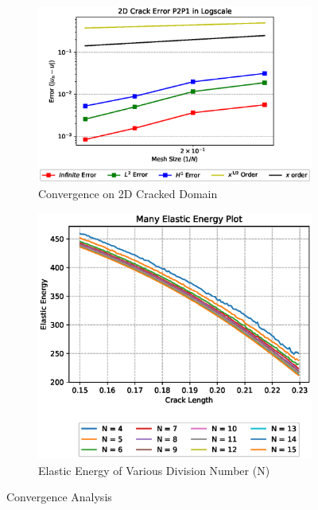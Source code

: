 \documentclass[a4paper,11pt]{article}
\begin{document}
\begin{figure}[h!]
	\begin{subfigure}[b]{0.49\linewidth}
		\centering
		\includegraphics[width=\linewidth]{picture/conference/crackerrP2P1case}
		\caption{Convergence on 2D Cracked Domain}
		\label{fig:all2dcrackerrorcase}
	\end{subfigure}
	\quad
	\begin{subfigure}[b]{0.49\linewidth}
		\centering
		\includegraphics[width=\linewidth]{picture/conference/manyelastic}
		\caption{Elastic Energy of Various Division Number (N)}
		\label{fig:manyelastic}
	\end{subfigure}
	\caption{Convergence Analysis}
	\label{fig:converganalysis}
\end{figure}
\newpage
\end{document}
